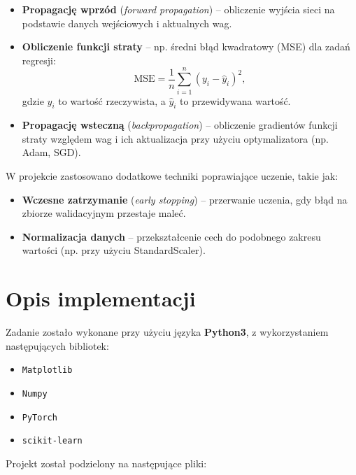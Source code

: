 \documentclass{classrep}
\begin{document}
\begin{itemize}
	\item \textbf{Propagację wprzód} (\textit{forward propagation}) -- obliczenie wyjścia sieci na podstawie danych wejściowych i aktualnych wag.
	\item \textbf{Obliczenie funkcji straty} -- np. średni błąd kwadratowy (MSE) dla zadań regresji:
	      \begin{equation}
		      \text{MSE} = \frac{1}{n} \sum_{i=1}^{n} (y_i - \hat{y}_i)^2,
	      \end{equation}
	      gdzie \( y_i \) to wartość rzeczywista, a \( \hat{y}_i \) to przewidywana wartość.
	\item \textbf{Propagację wsteczną} (\textit{backpropagation}) -- obliczenie gradientów funkcji straty względem wag i ich aktualizacja przy użyciu optymalizatora (np. Adam, SGD).
\end{itemize}

\noindent W projekcie zastosowano dodatkowe techniki poprawiające uczenie, takie jak:
\begin{itemize}
	\item \textbf{Wczesne zatrzymanie} (\textit{early stopping}) -- przerwanie uczenia, gdy błąd na zbiorze walidacyjnym przestaje maleć.
	\item \textbf{Normalizacja danych} -- przekształcenie cech do podobnego zakresu wartości (np. przy użyciu StandardScaler).
\end{itemize}
\clearpage{}
\section{Opis implementacji}

Zadanie zostało wykonane przy użyciu języka \textbf{Python3}, z wykorzystaniem następujących bibliotek:

\begin{itemize}
	\item \texttt{Matplotlib}
	\item \texttt{Numpy}
	\item \texttt{PyTorch}
	\item \texttt{scikit-learn}
\end{itemize}

Projekt został podzielony na następujące pliki:
\end{document}
